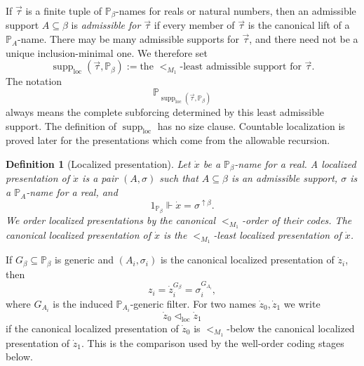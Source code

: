 \documentclass[a4paper,11pt]{article}
\newtheorem{definition}[theorem]{Definition}
\begin{document}
If \(\vec\tau\) is a finite tuple of \(\mathbb P_\beta\)-names for reals or
natural numbers, then an admissible support \(A\subseteq\beta\) is
\emph{admissible for \(\vec\tau\)} if every member of \(\vec\tau\) is the
canonical lift of a \(\mathbb P_A\)-name.  There may be many admissible supports
for \(\vec\tau\), and there need not be a unique inclusion-minimal one.  We
therefore set
\[
   \operatorname{supp}_{\mathrm{loc}}(\vec\tau,\mathbb P_\beta)
   :=
   \text{the }<_{M_1}\text{-least admissible support for }\vec\tau.
\]
The notation
\[
   \mathbb P_{\operatorname{supp}_{\mathrm{loc}}(\vec\tau,\mathbb P_\beta)}
\]
always means the complete subforcing determined by this least admissible
support.  The definition of \(\operatorname{supp}_{\mathrm{loc}}\) has no size
clause.  Countable localization is proved later for the presentations which
come from the allowable recursion.

\begin{definition}[Localized presentation]\label{def:localized-presentation}
Let \(\dot x\) be a \(\mathbb P_\beta\)-name for a real.  A
\emph{localized presentation} of \(\dot x\) is a pair \((A,\sigma)\) such that
\(A\subseteq\beta\) is an admissible support, \(\sigma\) is a
\(\mathbb P_A\)-name for a real, and
\[
   1_{\mathbb P_\beta}\Vdash
   \dot x=\sigma^{\uparrow\beta}.
\]
We order localized presentations by the canonical \(<_{M_1}\)-order of their
codes.  The \emph{canonical localized presentation} of \(\dot x\) is the
\(<_{M_1}\)-least localized presentation of \(\dot x\).
\end{definition}

If \(G_\beta\subseteq\mathbb P_\beta\) is generic and \((A_i,\sigma_i)\) is the
canonical localized presentation of \(\dot z_i\), then
\[
   z_i=\dot z_i^{G_\beta}=\sigma_i^{G_{A_i}},
\]
where \(G_{A_i}\) is the induced \(\mathbb P_{A_i}\)-generic filter.  For two
names \(\dot z_0,\dot z_1\) we write
\[
   \dot z_0\triangleleft_{\mathrm{loc}}\dot z_1
\]
if the canonical localized presentation of \(\dot z_0\) is \(<_{M_1}\)-below
the canonical localized presentation of \(\dot z_1\).  This is the comparison
used by the well-order coding stages below.
\end{document}
